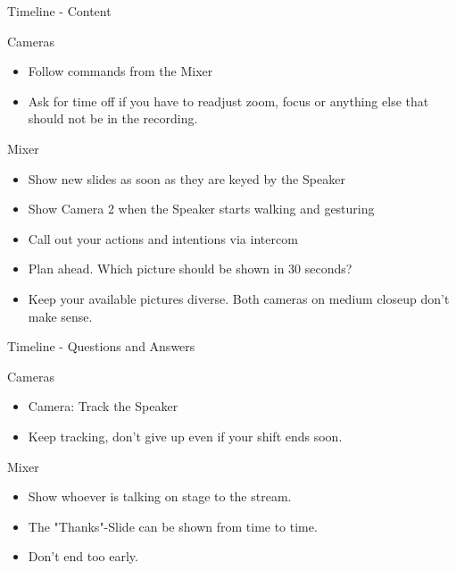 \documentclass[aspectratio=169]{beamer}
\begin{document}
\begin{frame}{Timeline - Content}
	\begin{block}{Cameras}
		\begin{itemize}
			\item Follow commands from the Mixer
			\item Ask for time off if you have to readjust zoom, focus or anything else that should not be in the recording.
		\end{itemize}
	\end{block}
	
	\begin{block}{Mixer}
		\begin{itemize}
			\item Show new slides as soon as they are keyed by the Speaker 
			\item Show Camera 2 when the Speaker starts walking and gesturing
			\item Call out your actions and intentions via intercom
			\item Plan ahead. Which picture should be shown in 30 seconds?
			\item Keep your available pictures diverse. Both cameras on medium closeup don't make sense.
		\end{itemize}
	\end{block}
\end{frame}

\begin{frame}{Timeline - Questions and Answers}
	\begin{block}{Cameras}
		\begin{itemize}
			\item Camera: Track the Speaker
			\item Keep tracking, don't give up even if your shift ends soon.
		\end{itemize}
	\end{block}
	
	\begin{block}{Mixer}
		\begin{itemize}
			\item Show whoever is talking on stage to the stream.
			\item The "Thanks"-Slide can be shown from time to time.
			\item Don't end too early.
		\end{itemize}
	\end{block}
\end{frame}
\end{document}
